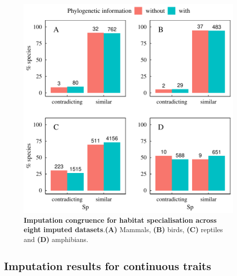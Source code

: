 \documentclass[11pt]{article}
\begin{document}
\pagebreak
\begin{figure}[h!]
\centering
\includegraphics[scale=0.6]{figures/Congruence_categorical_traits/Sp}
\caption[Imputation congruence for habitat specialisation across eight imputed datasets]{\textbf{Imputation congruence for habitat specialisation across eight imputed datasets}.\textbf{(A)} Mammals, \textbf{(B)} birds, \textbf{(C)} reptiles and \textbf{(D)} amphibians.}
\label{congruenceSp}
\end{figure}


\pagebreak
\subsection{Imputation results for continuous traits}
\end{document}
